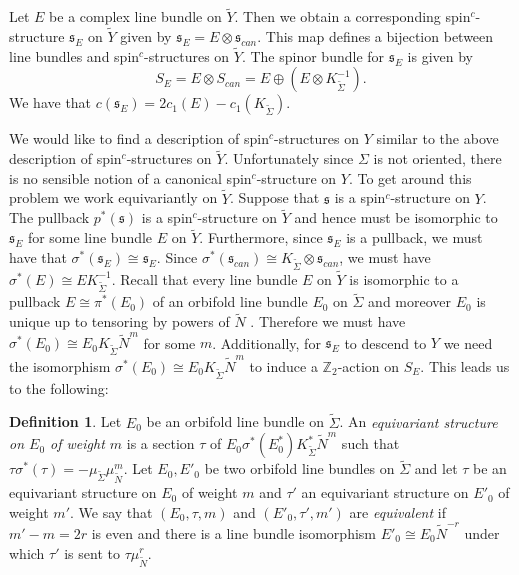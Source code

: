 \documentclass{amsart}
\theoremstyle{definition}
\newtheorem{definition}[theorem]{Definition}
\theoremstyle{remark}
\numberwithin{equation}{section}
\begin{document}
Let $E$ be a complex line bundle on $\widetilde{Y}$. Then we obtain a corresponding spin$^c$-structure $\mathfrak{s}_E$ on $\widetilde{Y}$ given by $\mathfrak{s}_E = E \otimes \mathfrak{s}_{can}$. This map defines a bijection between line bundles and spin$^c$-structures on $\widetilde{Y}$. The spinor bundle for $\mathfrak{s}_E$ is given by 
\[
S_E = E \otimes S_{can} = E \oplus (E \otimes K_{\widetilde{\Sigma}}^{-1}).
\]
We have that $c(\mathfrak{s}_E) = 2c_1(E) - c_1( K_{\widetilde{\Sigma}})$.

We would like to find a description of spin$^c$-structures on $Y$ similar to the above description of spin$^c$-structures on $\widetilde{Y}$. Unfortunately since $\Sigma$ is not oriented, there is no sensible notion of a canonical spin$^c$-structure on $Y$. To get around this problem we work equivariantly on $\widetilde{Y}$. Suppose that $\mathfrak{s}$ is a spin$^c$-structure on $Y$. The pullback $p^*(\mathfrak{s})$ is a spin$^c$-structure on $\widetilde{Y}$ and hence must be isomorphic to $\mathfrak{s}_E$ for some line bundle $E$ on $\widetilde{Y}$. Furthermore, since $\mathfrak{s}_E$ is a pullback, we must have that $\sigma^*(\mathfrak{s}_E) \cong \mathfrak{s}_E$. Since $\sigma^*(\mathfrak{s}_{can}) \cong K_{\widetilde{\Sigma}} \otimes \mathfrak{s}_{can}$, we must have $\sigma^*(E) \cong E K_{\widetilde{\Sigma}}^{-1}$. Recall that every line bundle $E$ on $\widetilde{Y}$ is isomorphic to a pullback $E \cong \pi^*(E_0)$ of an orbifold line bundle $E_0$ on $\widetilde{\Sigma}$ and moreover $E_0$ is unique up to tensoring by powers of $\widetilde{N}$ \cite[Theorem 2.0.19]{moy}. Therefore we must have $\sigma^*(E_0) \cong E_0 K_{\widetilde{\Sigma}} \widetilde{N}^m$ for some $m$. Additionally, for $\mathfrak{s}_{E}$ to descend to $Y$ we need the isomorphism $\sigma^*(E_0) \cong E_0 K_{\widetilde{\Sigma}} \widetilde{N}^m$ to induce a $\mathbb{Z}_2$-action on $S_{E}$. This leads us to the following: 

\begin{definition}\label{def:eqstr}
Let $E_0$ be an orbifold line bundle on $\widetilde{\Sigma}$. An {\em equivariant structure on $E_0$ of weight $m$} is a section $\tau$ of $E_0 \sigma^*(E_0^*)  K_{\widetilde{\Sigma}}^{*} \widetilde{N}^m$ such that $\tau \sigma^*(\tau) = - \mu_{\widetilde{\Sigma}} \mu_{\widetilde{N}}^m$. Let $E_0,E'_0$ be two orbifold line bundles on $\widetilde{\Sigma}$ and let $\tau$ be an equivariant structure on $E_0$ of weight $m$ and $\tau'$ an equivariant structure on $E'_0$ of weight $m'$. We say that $(E_0 , \tau , m)$ and $(E'_0 , \tau' , m')$ are {\em equivalent} if $m' - m = 2r$ is even and there is a line bundle isomorphism $E'_0 \cong E_0 \widetilde{N}^{-r}$ under which $\tau'$ is sent to $\tau \mu_{\widetilde{N}}^{r}$.
\end{definition}
\end{document}
